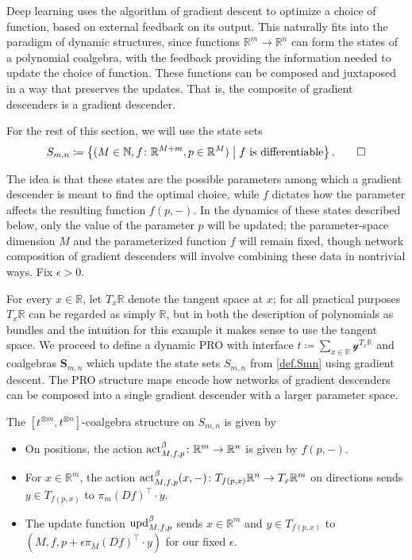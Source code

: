 \documentclass{eptcs}
\theoremstyle{definition}
\theoremstyle{plain}
\newenvironment{definition}
  {\pushQED{\qed}\renewcommand{\qedsymbol}{$\lozenge$}\definitionx}
  {\popQED\enddefinitionx}
\newcommand{\Cat}[1]{\textbf{#1}}%
\newcommand{\tn}[1]{\textnormal{#1}}
\newcommand{\nn}{\mathbb{N}}
\newcommand{\rr}{\mathbb{R}}
\newcommand{\act}{\tn{act}}
\newcommand{\upd}{\tn{upd}}
\newcommand{\yon}{\mathcal{y}}
\newcommand{\0}{\textsf{0}}
\newcommand{\1}{\tn{\textsf{1}}}
\renewcommand{\S}{{\Cat{S}}}
\begin{document}
Deep learning uses the algorithm of gradient descent to optimize a choice of function, based on external feedback on its output. This naturally fits into the paradigm of dynamic structures, since functions $\rr^m \to \rr^n$ can form the states of a polynomial coalgebra, with the feedback providing the information needed to update the choice of function. These functions can be composed and juxtaposed in a way that preserves the updates. That is, the composite of gradient descenders is a gradient descender.

\begin{definition}\label{def.Smn}
For the rest of this section, we will use the state sets 
\[
S_{m,n} \coloneqq \left\{(M \in \nn, f\colon \rr^{M+m}, p \in \rr^M) \;\middle|\; f \textrm{ is differentiable}\right\}.
\qedhere
\]
\end{definition}

The idea is that these states are the possible parameters among which a gradient descender is meant to find the optimal choice, while $f$ dictates how the parameter affects the resulting function $f(p,-)$. In the dynamics of these states described below, only the value of the parameter $p$ will be updated; the parameter-space dimension $M$ and the parameterized function $f$ will remain fixed, though network composition of gradient descenders will involve combining these data in nontrivial ways. Fix $\epsilon>0$.%

For every $x\in\rr$, let $T_x\rr$ denote the tangent space at $x$; for all practical purposes $T_x \rr$ can be regarded as simply $\rr$, but in both the description of polynomials as bundles and the intuition for this example it makes sense to use the tangent space. We proceed to define a dynamic PRO with interface $t \coloneqq \sum_{x \in \rr} \yon^{T_x \rr}$ and coalgebras $\S_{m,n}$ which update the state sets $S_{m,n}$ from \cref{def.Smn} using gradient descent. The PRO structure maps encode how networks of gradient descenders can be composed into a single gradient descender with a larger parameter space.

\begin{definition}
The $[t^{\otimes m},t^{\otimes n}]$-coalgebra structure on $S_{m,n}$ is given by 
\begin{itemize}
	\item On positions, the action $\act^\beta_{M,f,p}\colon \rr^m \to \rr^n$ is given by $f(p,-)$.
	\item For $x \in \rr^m$, the action $\act^\beta_{M,f,p}(x,-)\colon T_{f(p,x)} \rr^n \to T_x \rr^m$ on directions sends $y\in T_{f(p,x)}$ to $\pi_m (Df)^\top \cdot y$.
	\item The update function $\upd^\beta_{M,f,p}$ sends $x \in \rr^m$ and $y \in T_{f(p,x)}$ to $(M,f,p+\epsilon \pi_M (Df)^\top \cdot y)$ for our fixed $\epsilon$.
	\qedhere
\end{itemize}
\end{definition}
\end{document}
